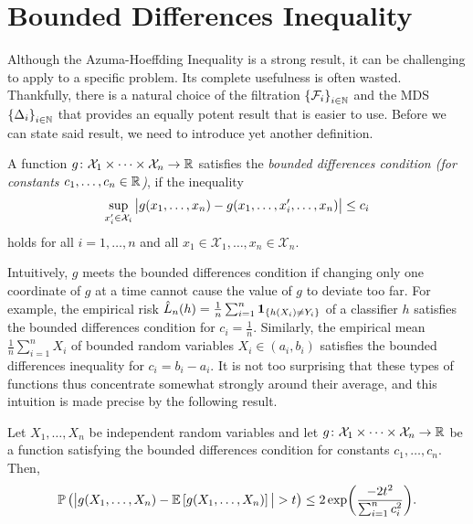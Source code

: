 \section{Bounded Differences Inequality}

Although the Azuma-Hoeffding Inequality is a strong result, it can be challenging to apply to a specific problem. Its complete usefulness is often wasted. Thankfully, there is a natural choice of the filtration $\left\{\mathcal{F}_i\right\}_{i\in\mathbb{N}}$ and the MDS $\left\{\Delta_i\right\}_{i\in\mathbb{N}}$ that provides an equally potent result that is easier to use. Before we can state said result, we need to introduce yet another definition.

\begin{definition}
A function $g \colon \mathcal{X}_1 \times \dots \times \mathcal{X}_n \to \mathbb{R}$ satisfies the \emph{bounded differences condition (for constants $c_1, \dots, c_n \in \mathbb{R}$)}, if the inequality
\[
    \sup_{x_i' \in \mathcal{X}_i} \big\lvert g(x_1, \dots, x_n) - g(x_1, \dots, x_i', \dots, x_n) \big\rvert \leq c_i
\]
holds for all $i = 1, \dots, n$ and all $x_1 \in \mathcal{X}_1, \dots, x_n \in \mathcal{X}_n$.
\end{definition}

Intuitively, $g$ meets the bounded differences condition if changing only one coordinate of $g$ at a time cannot cause the value of $g$ to deviate too far. For example, the empirical risk $\hat L_n(h) = \frac{1}{n} \sum_{i=1}^n \mathbf{1}_{\left\{h(X_i) \neq Y_i\right\}}$ of a classifier $h$ satisfies the bounded differences condition for $c_i = \frac{1}{n}$. Similarly, the empirical mean $\frac{1}{n} \sum_{i=1}^n X_i$ of bounded random variables $X_i \in (a_i, b_i)$ satisfies the bounded differences inequality for $c_i = b_i - a_i$. It is not too surprising that these types of functions thus concentrate somewhat strongly around their average, and this intuition is made precise by the following result.

\begin{theorem}
\label{thm: bounded differences inequality}
Let $X_1, \dots, X_n$ be independent random variables and let $g \colon \mathcal{X}_1 \times \dots \times \mathcal{X}_n \to \mathbb{R}$ be a function satisfying the bounded differences condition for constants $c_1, \dots, c_n$. Then,
\[
    \mathbb{P}\left(\big\lvert g(X_1, \dots, X_n) - \mathbb{E}\left[g(X_1, \dots, X_n)\right]\big\rvert > t \right) \leq 2 \exp(\frac{-2t^2}{\sum_{i=1}^n c_i^2}).
\]
\end{theorem}

